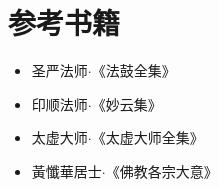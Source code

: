 \chapter{参考书籍}
\begin{itemize}
  \item 圣严法师$\cdot$《法鼓全集》
  \item 印顺法师$\cdot$《妙云集》
  \item 太虚大师$\cdot$《太虚大师全集》
  \item 黃懺華居士$\cdot$《佛教各宗大意》
\end{itemize}
